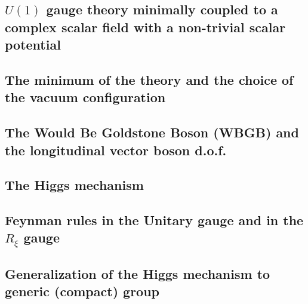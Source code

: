 \documentclass[TheoreticalPhy_ModB.tex]{subfiles}
\begin{document}
\subsection{$U(1)$ gauge theory minimally coupled to a complex scalar field with a non-trivial scalar potential}

\subsection{The minimum of the theory and the choice of the vacuum configuration}

\subsection{The Would Be Goldstone Boson (WBGB) and the longitudinal vector boson d.o.f.}

\subsection{The Higgs mechanism}

\subsection{Feynman rules in the Unitary gauge and in the $R_\xi$ gauge}

\subsection{Generalization of the Higgs mechanism to generic (compact) group}
\end{document}
